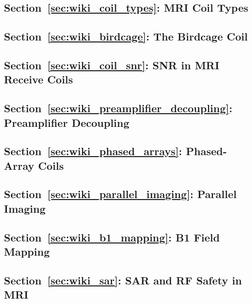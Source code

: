 
\subsection*{Section~\ref{sec:wiki_coil_types}: MRI Coil Types}

\subsection*{Section~\ref{sec:wiki_birdcage}: The Birdcage Coil}

\subsection*{Section~\ref{sec:wiki_coil_snr}: SNR in MRI Receive Coils}

\subsection*{Section~\ref{sec:wiki_preamplifier_decoupling}: Preamplifier Decoupling}

\subsection*{Section~\ref{sec:wiki_phased_arrays}: Phased-Array Coils}

\subsection*{Section~\ref{sec:wiki_parallel_imaging}: Parallel Imaging}

\subsection*{Section~\ref{sec:wiki_b1_mapping}: B1 Field Mapping}

\subsection*{Section~\ref{sec:wiki_sar}: SAR and RF Safety in MRI}

